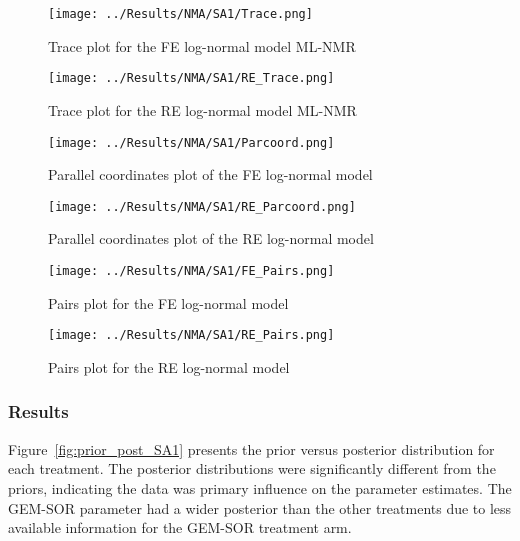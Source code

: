 \begin{figure}[h]
    \centering
    \begin{minipage}[b]{0.45\textwidth}
        \centering
        \texttt{[image: ../Results/NMA/SA1/Trace.png]}
        \caption{Trace plot for the FE log-normal model ML-NMR}
        \label{fig:traceSA1FE}
    \end{minipage}
    \hspace{0.05\textwidth}
    \begin{minipage}[b]{0.45\textwidth}
        \centering
        \texttt{[image: ../Results/NMA/SA1/RE\_Trace.png]}
        \caption{Trace plot for the RE log-normal model ML-NMR}
        \label{fig:traceSA1RE}
    \end{minipage}
\end{figure}

\begin{figure}[h]
    \centering
    \begin{minipage}[b]{0.45\textwidth}
        \centering
        \texttt{[image: ../Results/NMA/SA1/Parcoord.png]}
        \caption{Parallel coordinates plot of the FE log-normal model}
        \label{fig:parcoord_SA1}
    \end{minipage}
    \hspace{0.05\textwidth}
    \begin{minipage}[b]{0.45\textwidth}
        \centering
        \texttt{[image: ../Results/NMA/SA1/RE\_Parcoord.png]}
        \caption{Parallel coordinates plot of the RE log-normal model}
        \label{fig:RE_parcoord_SA1}
    \end{minipage}
\end{figure}

\begin{figure}[h]
    \centering
    \texttt{[image: ../Results/NMA/SA1/FE\_Pairs.png]}
    \caption{Pairs plot for the FE log-normal model}
    \label{fig:pairs_SA1}
\end{figure}

\begin{figure}[h]
    \centering
    \texttt{[image: ../Results/NMA/SA1/RE\_Pairs.png]}
    \caption{Pairs plot for the RE log-normal model}
    \label{fig:RE_pairs_SA1}
\end{figure}

\subsubsection{Results}
Figure~\ref{fig:prior_post_SA1} presents the prior versus posterior distribution for each treatment. The posterior distributions were significantly different from the priors, indicating the data was primary influence on the parameter estimates. The GEM-SOR parameter had a wider posterior than the other treatments due to less available information for the GEM-SOR treatment arm. \\

